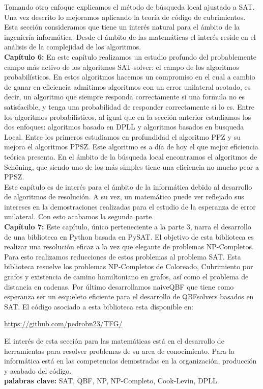 Tomando otro enfoque explicamos el método de búsqueda local ajustado a SAT. Una vez descrito lo mejoramos aplicando la teoría de código de cubrimientos. Esta sección consideramos que tiene un interés natural para el ámbito de la ingeniería informática. Desde el ámbito de las matemáticas el interés reside en el análisis de la complejidad de los algoritmos.\\

\textbf{Capítulo 6:} En este capítulo realizamos un estudio profundo del probablemente campo más activo de los algoritmos SAT-solver: el campo de los algoritmos probabilísticos. En estos algoritmos hacemos un compromiso en el cual a cambio de ganar en eficiencia admitimos algoritmos con un error unilateral acotado, es decir, un algoritmo que siempre responda correctamente si una formula no es satisfacible, y tenga una probabilidad de responder correctamente si lo es. Entre los algoritmos probabilísticos, al igual que en la sección anterior estudiamos los dos enfoques: algoritmos basado en DPLL y algoritmos basados en busqueda Local. Entre los primeros estudiamos en profundidad el algoritmo PPZ y su mejora el algoritmos PPSZ. Este algoritmo es a día de hoy el que mejor eficiencia teórica presenta. En el ámbito de la búsqueda local encontramos el algoritmos de Schöning, que siendo uno de los más simples tiene una eficiencia no mucho peor a PPSZ. \\

Este capítulo es de interés para el ámbito de la informática debido al desarrollo de algoritmos de resolución. A su vez, un matemático puede ver reflejado sus intereses en la demostraciones realizadas para el estudio de la esperanza de error unilateral. Con esto acabamos la segunda parte.\\


\textbf{Capítulo 7:} Este capítulo, único perteneciente a la parte 3, narra el desarrollo de una biblioteca en Python basada en PySAT. El objetivo de esta biblioteca es realizar una resolución eficaz a la vez que elegante de problemas NP-Completos. Para esto realizamos reducciones de estos problemas al problema SAT. Esta biblioteca resuelve los problemas NP-Completos de Coloreado, Cubrimiento por grafos y existencia de camino hamiltoniano en grafos, así como el problema de distancia en cadenas. Por último desarrollamos naiveQBF que tiene como esperanza ser un esqueleto eficiente para el desarrollo de QBFsolvers basados en SAT. El código asociado a esta biblioteca esta disponible en:

\begin{center}
  \url{https://github.com/pedrobn23/TFG/}
\end{center}

El interés de esta sección para las matemáticas está en el desarrollo de herramientas para resolver problemas de su area de conocimiento. Para la informática está en las competencias demostradas en la organización, producción y acabado del código.\\

\textbf{palabras clave:} SAT, QBF, NP, NP-Completo, Cook-Levin, DPLL.





